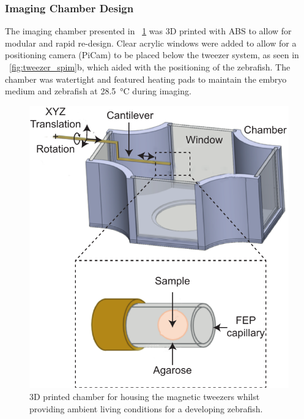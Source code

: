 \subsubsection{Imaging Chamber Design}

The imaging chamber presented in \figurename~\ref{fig:fep_chamber} was 3D printed with \gls{ABS} to allow for modular and rapid re-design.
Clear acrylic windows were added to allow for a positioning camera (PiCam) to be placed below the tweezer system, as seen in \figurename~\ref{fig:tweezer_spim}b, which aided with the positioning of the \gls{zebrafish}.
The chamber was watertight and featured heating pads to maintain the embryo medium and zebrafish at \SI{28.5}{\celsius} during imaging.


\begin{figure}
 \centering
 \includegraphics{Chapters/tweezers/Figs/PDF/fep_chamber}
 \caption{3D printed chamber for housing the magnetic tweezers whilst providing ambient living conditions for a developing \gls{zebrafish}.}\label{fig:fep_chamber}
\end{figure}

